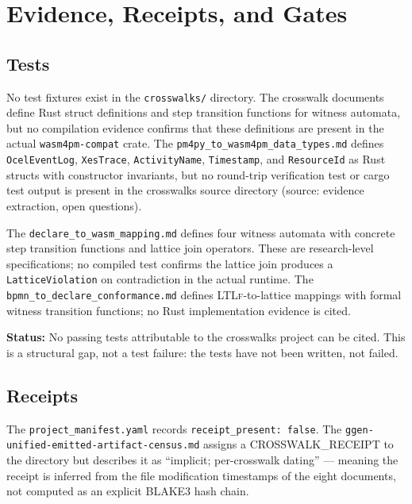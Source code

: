 
\section{Evidence, Receipts, and Gates}
\label{sec:crosswalks-evidence}

\subsection{Tests}
\label{sec:crosswalks-evidence-tests}

No test fixtures exist in the \texttt{crosswalks/} directory. The crosswalk documents define
Rust struct definitions and step transition functions for witness automata, but no compilation
evidence confirms that these definitions are present in the actual \texttt{wasm4pm-compat} crate.
The \texttt{pm4py\_to\_wasm4pm\_data\_types.md} defines \texttt{OcelEventLog},
\texttt{XesTrace}, \texttt{ActivityName}, \texttt{Timestamp}, and \texttt{ResourceId} as Rust
structs with constructor invariants, but no round-trip verification test or cargo test output
is present in the crosswalks source directory (source: evidence extraction, open questions).

The \texttt{declare\_to\_wasm\_mapping.md} defines four witness automata with concrete step
transition functions and lattice join operators. These are research-level specifications; no
compiled test confirms the lattice join produces a \texttt{LatticeViolation} on contradiction
in the actual runtime. The \texttt{bpmn\_to\_declare\_conformance.md} defines \textsc{LTLf}-to-lattice
mappings with formal witness transition functions; no Rust implementation evidence is cited.

\textbf{Status:} No passing tests attributable to the crosswalks project can be cited. This
is a structural gap, not a test failure: the tests have not been written, not failed.

\subsection{Receipts}
\label{sec:crosswalks-evidence-receipts}

The \texttt{project\_manifest.yaml} records \texttt{receipt\_present: false}. The
\texttt{ggen-unified-emitted-artifact-census.md} assigns a \textsc{CROSSWALK\_RECEIPT} to the
directory but describes it as ``implicit; per-crosswalk dating'' --- meaning the receipt is
inferred from the file modification timestamps of the eight documents, not computed as an
explicit \textsc{BLAKE3} hash chain.

